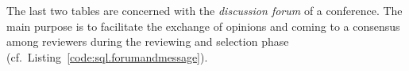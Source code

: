%


\medskip

The last two tables are concerned with the \emph{discussion forum} of a
conference. The main purpose is to facilitate the exchange of opinions and
coming to a consensus among reviewers during the reviewing and selection
phase (cf.\ Listing~\ref{code:sql.forumandmessage}).

%


%



%



%

